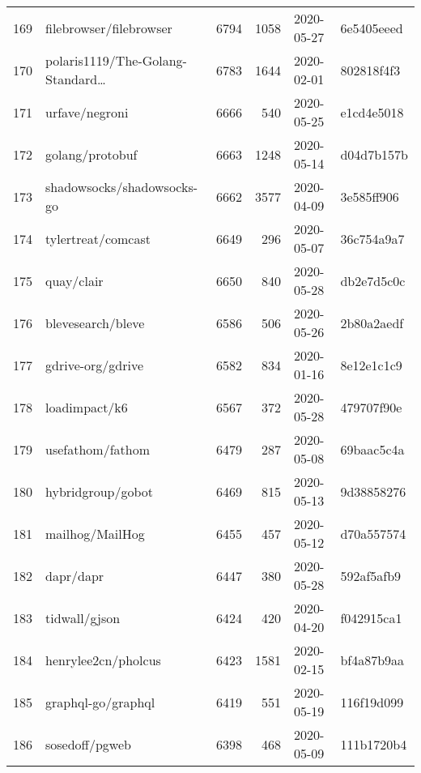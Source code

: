 \begin{longtable}{llrrll}
    169 &                            filebrowser/filebrowser &   6794 &   1058 & 2020-05-27 &  6e5405eeed \\
    170 &              polaris1119/The-Golang-Standard\ldots &   6783 &   1644 & 2020-02-01 &  802818f4f3 \\
    171 &                                     urfave/negroni &   6666 &    540 & 2020-05-25 &  e1cd4e5018 \\
    172 &                                    golang/protobuf &   6663 &   1248 & 2020-05-14 &  d04d7b157b \\
    173 &                         shadowsocks/shadowsocks-go &   6662 &   3577 & 2020-04-09 &  3e585ff906 \\
    174 &                                 tylertreat/comcast &   6649 &    296 & 2020-05-07 &  36c754a9a7 \\
    175 &                                         quay/clair &   6650 &    840 & 2020-05-28 &  db2e7d5c0c \\
    176 &                                  blevesearch/bleve &   6586 &    506 & 2020-05-26 &  2b80a2aedf \\
    177 &                                  gdrive-org/gdrive &   6582 &    834 & 2020-01-16 &  8e12e1c1c9 \\
    178 &                                      loadimpact/k6 &   6567 &    372 & 2020-05-28 &  479707f90e \\
    179 &                                   usefathom/fathom &   6479 &    287 & 2020-05-08 &  69baac5c4a \\
    180 &                                  hybridgroup/gobot &   6469 &    815 & 2020-05-13 &  9d38858276 \\
    181 &                                    mailhog/MailHog &   6455 &    457 & 2020-05-12 &  d70a557574 \\
    182 &                                          dapr/dapr &   6447 &    380 & 2020-05-28 &  592af5afb9 \\
    183 &                                      tidwall/gjson &   6424 &    420 & 2020-04-20 &  f042915ca1 \\
    184 &                                henrylee2cn/pholcus &   6423 &   1581 & 2020-02-15 &  bf4a87b9aa \\
    185 &                                 graphql-go/graphql &   6419 &    551 & 2020-05-19 &  116f19d099 \\
    186 &                                     sosedoff/pgweb &   6398 &    468 & 2020-05-09 &  111b1720b4 \\

\end{longtable}
